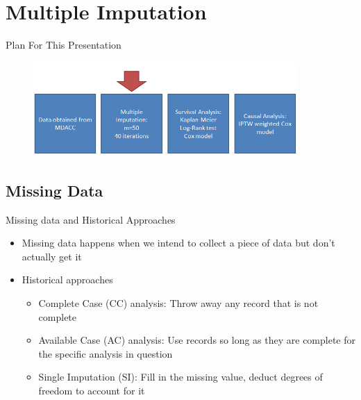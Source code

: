 \section{Multiple Imputation}
\begin{frame}{Plan For This Presentation}
  \begin{figure}[h!]
  \centering
    \includegraphics[width=0.9\textwidth]{mi_flow}
\label{fig:mi_flow}
\end{figure} 
\end{frame}

\subsection{Missing Data}
\begin{frame}{Missing data and Historical Approaches}
 \begin{itemize}
 \item Missing data happens when we intend to collect a piece of data but don't actually get it
 \item Historical approaches
 \begin{itemize}
  \item Complete Case (CC) analysis: Throw away any record that is not complete
 \item Available Case (AC) analysis: Use records so long as they are complete for the specific analysis in question
 \item Single Imputation (SI): Fill in the missing value, deduct degrees of freedom to account for it
 \end{itemize}
 \end{itemize}
 
\end{frame}

